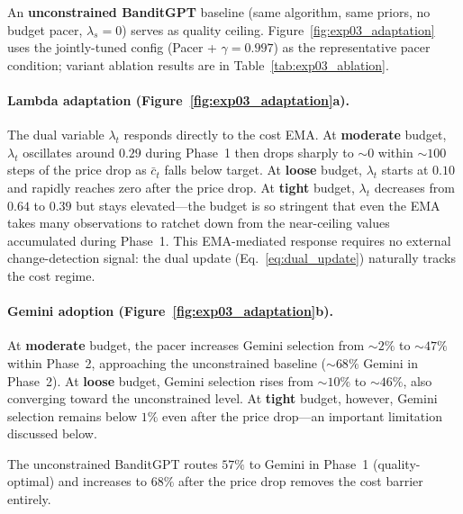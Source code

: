 \noindent
An \textbf{unconstrained BanditGPT} baseline (same algorithm, same
priors, no budget pacer, $\lambda_s{=}0$) serves as quality ceiling.
Figure~\ref{fig:exp03_adaptation} uses the jointly-tuned config
(Pacer + $\gamma{=}0.997$) as the representative pacer condition;
variant ablation results are in Table~\ref{tab:exp03_ablation}.

\paragraph{Lambda adaptation (Figure~\ref{fig:exp03_adaptation}a).}
The dual variable $\lambda_t$ responds directly to the cost EMA.
At \textbf{moderate} budget, $\lambda_t$ oscillates around
$0.29$ during Phase~1 then drops sharply
to ${\sim}0$ within ${\sim}100$ steps of the price drop as
$\bar{c}_t$ falls below target.
At \textbf{loose} budget, $\lambda_t$ starts at $0.10$
and rapidly reaches zero after the price drop.
At \textbf{tight} budget, $\lambda_t$ decreases from $0.64$
to $0.39$ but stays elevated---the budget is so stringent that
even the EMA takes many observations to ratchet down from the
near-ceiling values accumulated during Phase~1.
This EMA-mediated response requires no external change-detection
signal: the dual update (Eq.~\ref{eq:dual_update}) naturally tracks
the cost regime.

\paragraph{Gemini adoption (Figure~\ref{fig:exp03_adaptation}b).}
At \textbf{moderate} budget, the pacer increases Gemini selection
from ${\sim}2\%$ to ${\sim}47\%$ within Phase~2, approaching the
unconstrained baseline (${\sim}68\%$ Gemini in Phase~2).
At \textbf{loose} budget, Gemini selection rises from ${\sim}10\%$
to ${\sim}46\%$, also converging toward the unconstrained level.
At \textbf{tight} budget, however, Gemini selection remains below
$1\%$ even after the price drop---an important limitation discussed
below.

The unconstrained BanditGPT routes $57\%$ to Gemini in Phase~1
(quality-optimal) and increases to $68\%$ after the price drop
removes the cost barrier entirely.

